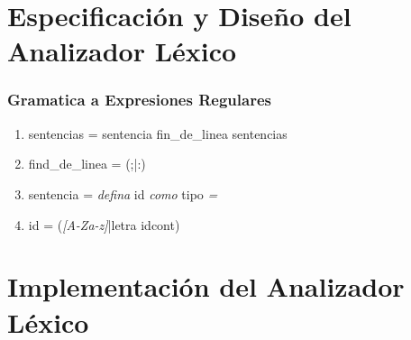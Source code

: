 \section{Especificación y Diseño del Analizador Léxico}

\subsubsection{Gramatica a Expresiones Regulares}

\begin{enumerate}
    \item sentencias = sentencia fin\_de\_linea sentencias
    \item find\_de\_linea = (;|:)
    \item sentencia = \textit{defina} id \textit{como} tipo \textit{=}
    \item id = (\textit{[A-Za-z]}|letra idcont)
\end{enumerate}

\section{Implementación del Analizador Léxico}